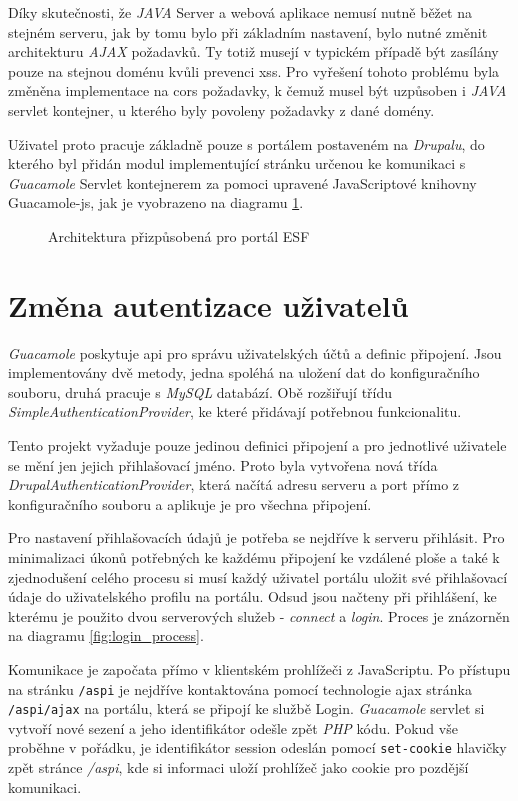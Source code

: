 Díky skutečnosti, že \emph{JAVA} Server a webová aplikace nemusí nutně běžet na stejném serveru, jak by tomu bylo při základním nastavení, bylo nutné změnit architekturu \emph{AJAX} požadavků. Ty totiž musejí v typickém případě být zasílány pouze na stejnou doménu kvůli prevenci \gls{xss}. Pro vyřešení tohoto problému byla změněna implementace na \gls{cors} požadavky, k čemuž musel být uzpůsoben i \emph{JAVA} \gls{servlet} kontejner, u kterého byly povoleny požadavky z dané domény. 

Uživatel proto pracuje základně pouze s portálem postaveném na \emph{Drupalu}, do kterého byl přidán modul implementující stránku určenou ke komunikaci s \emph{Guacamole} Servlet kontejnerem za pomoci upravené JavaScriptové knihovny Guacamole-js, jak je vyobrazeno na diagramu \ref{fig:arch_drupal}.

\begin{figure}[htp] 
  \caption{Architektura přizpůsobená pro portál ESF}
  \label{fig:arch_drupal}
\end{figure}  

\section{Změna autentizace uživatelů}
\emph{Guacamole} poskytuje \gls{api} pro správu uživatelských účtů a definic připojení. Jsou implementovány dvě metody, jedna spoléhá na uložení dat do konfiguračního souboru, druhá pracuje s \emph{MySQL} databází. Obě rozšiřují třídu \emph{SimpleAuthenticationProvider}, ke které přidávají potřebnou funkcionalitu. 

Tento projekt vyžaduje pouze jedinou definici připojení a pro jednotlivé uživatele se mění jen jejich přihlašovací jméno. Proto byla vytvořena nová třída \emph{DrupalAuthenticationProvider}, která načítá adresu serveru a port přímo z konfiguračního souboru a aplikuje je pro všechna připojení.

Pro nastavení přihlašovacích údajů je potřeba se nejdříve k serveru přihlásit. Pro minimalizaci úkonů potřebných ke každému připojení ke vzdálené ploše a také k zjednodušení celého procesu si musí každý uživatel portálu uložit své přihlašovací údaje do uživatelského profilu na portálu. Odsud jsou načteny při přihlášení, ke kterému je použito dvou serverových služeb - \emph{connect} a \emph{login}. Proces je znázorněn na diagramu \ref{fig:login_process}. 

Komunikace je započata přímo v klientském prohlížeči z JavaScriptu. Po přístupu na stránku \texttt{/aspi} je nejdříve kontaktována pomocí technologie \gls{ajax} stránka \texttt{/aspi/ajax} na portálu, která se připojí ke službě Login. \emph{Guacamole} \gls{servlet} si vytvoří nové sezení a jeho identifikátor odešle zpět \emph{PHP} kódu. Pokud vše proběhne v pořádku, je identifikátor \gls{session} odeslán pomocí \texttt{set-cookie} hlavičky zpět stránce \emph{/aspi}, kde si informaci uloží prohlížeč jako cookie pro pozdější komunikaci. 

